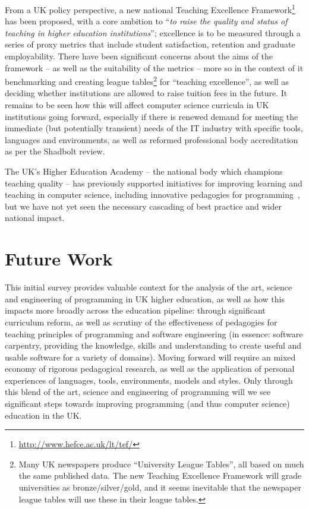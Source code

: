 \documentclass[english,submission]{programming}
\begin{document}
From a UK policy perspective, a new national Teaching Excellence
Framework\footnote{\url{http://www.hefce.ac.uk/lt/tef/}} has been
proposed, with a core ambition to ``{\emph{to raise the quality and
status of teaching in higher education institutions}}''; excellence is
to be measured through a series of proxy metrics that include student
satisfaction, retention and graduate employability. There have been
significant concerns about the aims of the framework -- as well as the
suitability of the metrics -- more so in the context of it
benchmarking and creating league tables\footnote{Many UK newspapers produce ``University League Tables'', all based on much the same published data. The new Teaching Excellence Framework will grade universities as bronze/silver/gold, and it seems inevitable that the newspaper league tables will use these in their league tables.} for ``teaching excellence'',
as well as deciding whether institutions are allowed to raise tuition
fees in the future. It remains to be seen how this will affect
computer science curricula in UK institutions going forward,
especially if there is renewed demand for meeting the immediate (but
potentially transient) needs of the IT industry with specific tools,
languages and environments, as well as reformed professional body
accreditation as per the Shadbolt review.

The UK's Higher Education Academy -- the national body which champions
teaching quality -- has previously supported initiatives for improving
learning and teaching in computer science, including innovative
pedagogies for
programming~\cite{crick-et-al-hea:2015,davenport-et-al:latice2016},
but we have not yet seen the necessary cascading of best practice and
wider national impact.

\section{Future Work}

This initial survey provides valuable context for the analysis of the
art, science and engineering of programming in UK higher education, as
well as how this impacts more broadly across the education pipeline:
through significant curriculum reform, as well as scrutiny of the
effectiveness of pedagogies for teaching principles of programming and
software engineering (in essence: software carpentry, providing the
knowledge, skills and understanding to create useful and usable
software for a variety of domains). Moving forward will require an
mixed economy of rigorous pedagogical research, as well as the
application of personal experiences of languages, tools, environments,
models and styles. Only through this blend of the art, science and
engineering of programming will we see significant steps towards
improving programming (and thus computer science) education in the UK.
\end{document}
